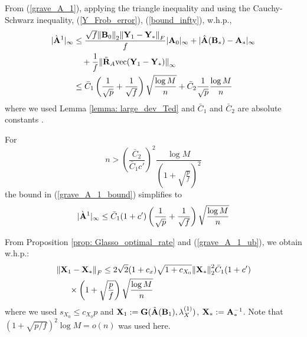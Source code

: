 \begin{IEEEproof}
From (\ref{grave_A_1}), applying the triangle inequality and using the Cauchy-Schwarz inequality, (\ref{Y_Frob_error}), (\ref{bound_infty}), w.h.p.,
\begin{align}
	|\grave{\bA}^1|_\infty %
		&\leq \frac{\sqrt{f} \nn \bB_0\nn_2 \nn \bY_1-\bY_*\nn_F}{f} |\bA_0|_\infty + |\hat{\bA}(\bB_*)-\bA_*|_\infty \nonumber \\
		&\quad + \frac{1}{f}\nn \tilde{\bR}_A\vec(\bY_1-\bY_*) \nn_\infty \nonumber \\
		&\leq \bar{C}_1 \left( \frac{1}{\sqrt{p}} + \frac{1}{\sqrt{f}} \right) \sqrt{\frac{\log M}{n}} + \bar{C}_2 \frac{1}{\sqrt{p}} \frac{\log M}{n} 	\label{grave_A_1_bound}
\end{align}
where we used Lemma \ref{lemma: large_dev_Ted} and $\bar{C}_1$ and $\bar{C}_2$ are absolute constants \cite{TsiligkaridisTSP}.

For 
\begin{equation*}
	n> (\frac{\bar{C}_2}{\bar{C}_1 c'})^2 \frac{\log M}{(1+\sqrt{\frac{p}{f}})^2}
\end{equation*}
the bound in (\ref{grave_A_1_bound}) simplifies to
\begin{equation} \label{grave_A_1_ub}
	|\grave{{\mathbf{A}}}^1|_\infty \leq \bar{C}_1 (1+c') \left(\frac{1}{\sqrt{p}}+\frac{1}{\sqrt{f}}\right) \sqrt{\frac{\log M}{n}}
\end{equation}



From Proposition \ref{prop: Glasso_optimal_rate} and (\ref{grave_A_1_ub}), we obtain w.h.p.:
\begin{align}
	{ \parallel } &{\mathbf{X}}_1-{\mathbf{X}}_* { \parallel }_F \leq 2\sqrt{2}(1+c_x)\sqrt{1+c_{X_0}} { \parallel }{\mathbf{X}}_*{ \parallel }_2^2 \bar{C}_1 (1+c') \nonumber \\
		&\quad \times \left( 1 + \sqrt{\frac{p}{f}} \right) \sqrt{\frac{\log M}{n}} \label{X_Frob_error}
\end{align}
where we used $s_{X_0}\leq c_{X_0} p$ and ${\mathbf{X}}_1:={\mathbf{G}}(\hat{{\mathbf{A}}}({\mathbf{B}}_1), \lambda_X^{(1)})$, ${\mathbf{X}}_*:={\mathbf{A}}_*^{-1}$. Note that $(1+\sqrt{p/f})^2\log M=o(n)$ was used here.


\end{IEEEproof}
